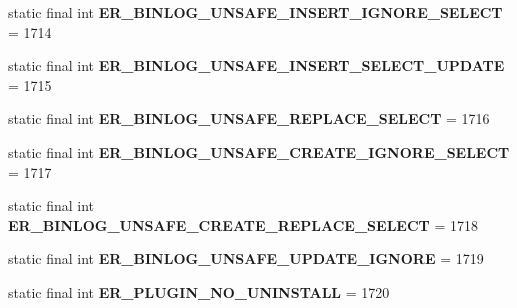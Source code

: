 \begin{DoxyCompactItemize}
static final int {\bfseries E\+R\+\_\+\+B\+I\+N\+L\+O\+G\+\_\+\+U\+N\+S\+A\+F\+E\+\_\+\+I\+N\+S\+E\+R\+T\+\_\+\+I\+G\+N\+O\+R\+E\+\_\+\+S\+E\+L\+E\+CT} = 1714
\item 
\mbox{\label{classcom_1_1mysql_1_1cj_1_1exceptions_1_1_mysql_error_numbers_a894dc2689ce409df7b0464e416d3ce83}} 
static final int {\bfseries E\+R\+\_\+\+B\+I\+N\+L\+O\+G\+\_\+\+U\+N\+S\+A\+F\+E\+\_\+\+I\+N\+S\+E\+R\+T\+\_\+\+S\+E\+L\+E\+C\+T\+\_\+\+U\+P\+D\+A\+TE} = 1715
\item 
\mbox{\label{classcom_1_1mysql_1_1cj_1_1exceptions_1_1_mysql_error_numbers_af089572cda2fab7e79e8840d536cf5e5}} 
static final int {\bfseries E\+R\+\_\+\+B\+I\+N\+L\+O\+G\+\_\+\+U\+N\+S\+A\+F\+E\+\_\+\+R\+E\+P\+L\+A\+C\+E\+\_\+\+S\+E\+L\+E\+CT} = 1716
\item 
\mbox{\label{classcom_1_1mysql_1_1cj_1_1exceptions_1_1_mysql_error_numbers_a99692abd2167d3cae7f2feafc227385e}} 
static final int {\bfseries E\+R\+\_\+\+B\+I\+N\+L\+O\+G\+\_\+\+U\+N\+S\+A\+F\+E\+\_\+\+C\+R\+E\+A\+T\+E\+\_\+\+I\+G\+N\+O\+R\+E\+\_\+\+S\+E\+L\+E\+CT} = 1717
\item 
\mbox{\label{classcom_1_1mysql_1_1cj_1_1exceptions_1_1_mysql_error_numbers_a010a7baac222e0aeb979a97c23677220}} 
static final int {\bfseries E\+R\+\_\+\+B\+I\+N\+L\+O\+G\+\_\+\+U\+N\+S\+A\+F\+E\+\_\+\+C\+R\+E\+A\+T\+E\+\_\+\+R\+E\+P\+L\+A\+C\+E\+\_\+\+S\+E\+L\+E\+CT} = 1718
\item 
\mbox{\label{classcom_1_1mysql_1_1cj_1_1exceptions_1_1_mysql_error_numbers_abb171d3f6fc6816824633a3aa7af3103}} 
static final int {\bfseries E\+R\+\_\+\+B\+I\+N\+L\+O\+G\+\_\+\+U\+N\+S\+A\+F\+E\+\_\+\+U\+P\+D\+A\+T\+E\+\_\+\+I\+G\+N\+O\+RE} = 1719
\item 
\mbox{\label{classcom_1_1mysql_1_1cj_1_1exceptions_1_1_mysql_error_numbers_a578c0f562c9d4ce5ed7d4431b541090b}} 
static final int {\bfseries E\+R\+\_\+\+P\+L\+U\+G\+I\+N\+\_\+\+N\+O\+\_\+\+U\+N\+I\+N\+S\+T\+A\+LL} = 1720

\end{DoxyCompactItemize}
